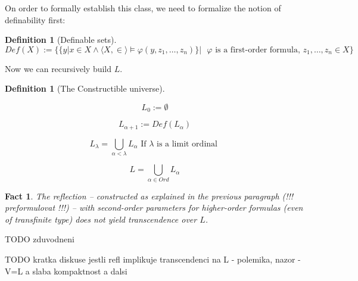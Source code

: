 \documentclass[12pt,a4paper]{article}
\newtheorem{definition}[theorem]{Definition}
\newtheorem{Fact}[theorem]{Fact}
\newcommand{\bce}{\begin{compactenum}}
\newcommand{\ece}{\end{compactenum}}
\begin{document}
On order to formally establish this class, we need to formalize the notion of definability first:

\begin{definition}[Definable sets]
\begin{equation}
Def(X) := \{\{{y | x }\in X \land \langle X, \in \rangle \models \varphi(y, z_1,\ldots,z_n) \} |\mbox{ }\varphi\mbox{ is a first-order formula, }z_1,\ldots,z_n \in X \}
\end{equation}
\end{definition}

Now we can recursively build $L$.
\begin{definition}[The Constructible universe\newline]
\bce[(i)]
\item
\begin{equation}
L_0 := \emptyset
\end{equation}

\item
\begin{equation}
L_{\alpha+1} := Def(L_{\alpha})
\end{equation}
\item
\begin{equation}
L_{\lambda} = \bigcup_{\alpha < \lambda} L_{\alpha}\mbox{ If }\lambda\mbox{ is a limit ordinal }
\end{equation}
\item
\begin{equation}
L = \bigcup_{\alpha\in Ord} L_{\alpha}
\end{equation}
\ece
\end{definition}

\begin{Fact}
The reflection -- constructed as explained in the previous paragraph (!!! preformulovat !!!) -- with second-order parameters for higher-order formulas (even of transfinite type) does not yield transcendence over $L$.
\end{Fact}
TODO zduvodneni

TODO kratka diskuse jestli refl implikuje transcendenci na L - polemika, nazor - V=L a slaba kompaktnost a dalsi
\newpage



\end{document}
